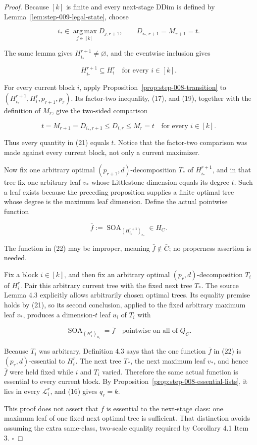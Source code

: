 \begin{proof}
Because \([k]\) is finite and every next-stage DDim is defined by
Lemma~\ref{lem:step-009-legal-state}, choose

\[
 i_*\in\operatorname*{arg\,max}_{j\in[k]}D_{j,r+1},
 \qquad
 D_{i_*,r+1}=M_{r+1}=t.
 \tag{19}
\]

The same lemma gives \(H_{i_*}^{r+1}\ne\varnothing\), and the 
eventwise inclusion gives

\[
 H_{i_*}^{r+1}\subseteq H_i^r
 \quad\text{for every }i\in[k].
 \tag{20}
\]

For every current block \(i\), apply
Proposition~\ref{prop:step-008-transition} to
\((H_{i_*}^{r+1},H_i^r,p_{r+1},p_r)\). Its factor-two inequality, (17), and
(19), together with the definition of \(M_r\), give the two-sided comparison

\[
 t=M_{r+1}=D_{i_*,r+1}
 \le D_{i,r}
 \le M_r=t
 \quad\text{for every }i\in[k].
 \tag{21}
\]

Thus every quantity in (21) equals \(t\). Notice that the factor-two
comparison was made against every current block, not only a current
maximizer.

Now fix one arbitrary optimal \((p_{r+1},d)\)-decomposition
\(T_*\) of \(H_{i_*}^{r+1}\), and in that tree fix one arbitrary leaf
\(v_*\) whose Littlestone dimension equals its degree \(t\). Such a leaf
exists because the preceding proposition supplies a finite optimal tree
whose degree is the maximum leaf dimension. Define the actual pointwise
function

\[
 \bar f:=\operatorname{SOA}_{(H_{i_*}^{r+1})_{v_*}}
 \in H_C.
 \tag{22}
\]

The function in (22) may be improper, meaning \(\bar f\notin\bar C\); no
properness assertion is needed.

Fix a block \(i\in[k]\), and then fix an arbitrary optimal
\((p_r,d)\)-decomposition \(T_i\) of \(H_i^r\). Pair this arbitrary current
tree with the fixed next tree \(T_*\). The source Lemma 4.3 explicitly
allows arbitrarily chosen optimal trees. Its equality premise holds by
(21), so its second conclusion, applied to the fixed arbitrary maximum
leaf \(v_*\), produces a dimension-\(t\) leaf \(u_i\) of \(T_i\) with

\[
 \operatorname{SOA}_{(H_i^r)_{u_i}}=\bar f
 \quad\text{pointwise on all of }Q_C.
 \tag{23}
\]

Because \(T_i\) was arbitrary, Definition 4.3 says that the one function
\(\bar f\) in (22) is \((p_r,d)\)-essential to \(H_i^r\). The next tree
\(T_*\), the next maximum leaf \(v_*\), and hence \(\bar f\) were held
fixed while \(i\) and \(T_i\) varied. Therefore the same actual function
is essential to every current block. By
Proposition~\ref{prop:step-008-essential-lists}, it lies in every
\(\mathcal L_i^r\), and (16) gives \(q_r=k\).

This proof does not assert that \(\bar f\) is essential to the next-stage
class: one maximum leaf of one fixed next optimal tree is sufficient. That
distinction avoids assuming the extra same-class, two-scale equality
required by Corollary 4.1 Item 3. \(\square\)


\end{proof}

